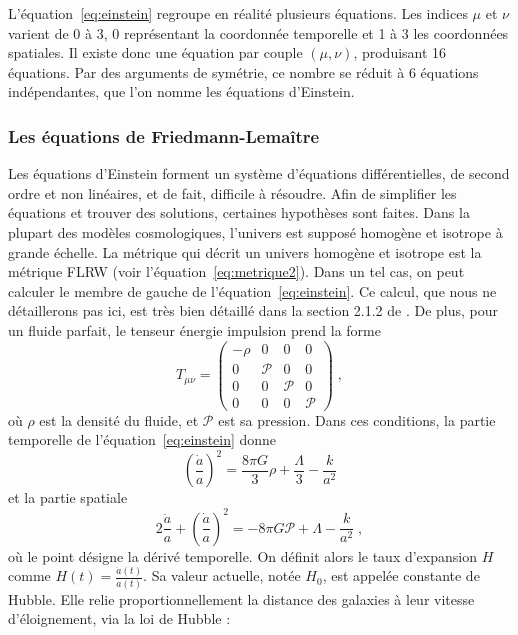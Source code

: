 \documentclass[11pt, twoside, a4paper, openright]{report}
\begin{document}
L'équation~\ref{eq:einstein} regroupe en réalité plusieurs équations. Les indices $\mu$ et $\nu$ varient de 0 à 3, 0 représentant la coordonnée temporelle et 1 à 3 les coordonnées spatiales. Il existe donc une équation par couple $(\mu, \nu)$, produisant 16 équations. Par des arguments de symétrie, ce nombre se réduit à 6 équations indépendantes, que l'on nomme les équations d'Einstein.

\subsubsection{Les équations de Friedmann-Lemaître}
Les équations d'Einstein forment un système d'équations différentielles, de second ordre et non linéaires, et de fait, difficile à résoudre. Afin de simplifier les équations et trouver des solutions, certaines hypothèses sont faites. Dans la plupart des modèles cosmologiques, l'univers est supposé homogène et isotrope à grande échelle.
La métrique qui décrit un univers homogène et isotrope est la métrique FLRW (voir l'équation~\ref{eq:metrique2}).
Dans un tel cas, on peut calculer le membre de gauche de l'équation~\ref{eq:einstein}. Ce calcul, que nous ne détaillerons pas ici, est très bien détaillé dans la section 2.1.2 de \textcite{Dodelson2003}. De plus, pour un fluide parfait, le tenseur énergie impulsion prend la forme
\begin{equation}
  T_{\mu \nu} =
  \begin{pmatrix}
    -\rho & 0 & 0 & 0 \\
    0 & \mathcal{P} & 0 & 0\\
    0 & 0 & \mathcal{P} & 0\\
    0 & 0 & 0 & \mathcal{P}
  \end{pmatrix}  \; ,
\end{equation}
où $\rho$ est la densité du fluide, et $\mathcal{P}$ est sa pression. Dans ces conditions, la partie temporelle de l'équation~\ref{eq:einstein} donne
\begin{equation}
  \label{eq:friedmann1}
  \left(\frac{\dot{a}}{a}\right)^2 = \frac{8 \pi G}{3}\rho + \frac{\Lambda}{3} - \frac{k}{a^2} 
\end{equation}
et la partie spatiale
\begin{equation}
  \label{eq:friedmann2}
  2 \frac{\ddot{a}}{a} + \left(\frac{\dot{a}}{a}\right)^2 = - 8 \pi G \mathcal{P} + \Lambda - \frac{k}{a^2}  \; ,
\end{equation}
où le point désigne la dérivé temporelle. On définit alors le taux d'expansion $H$ comme $H(t) = \frac{\dot{a}(t)}{a(t)}$. Sa valeur actuelle, notée $H_0$, est appelée constante de Hubble. Elle relie proportionnellement la distance des galaxies à leur vitesse d'éloignement, via la loi de Hubble :
\end{document}
